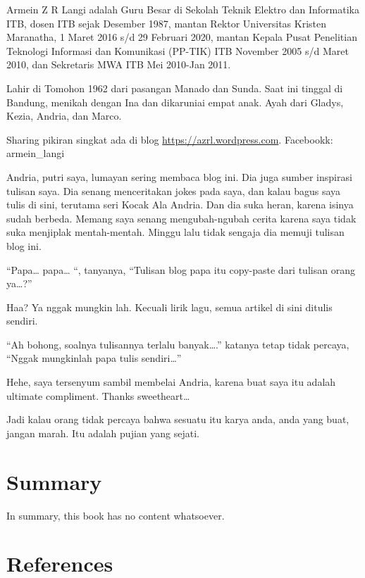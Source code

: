 \documentclass[
  letterpaper,
  DIV=11,
  numbers=noendperiod]{scrreprt}
\begin{document}
Armein Z R Langi adalah Guru Besar di Sekolah Teknik Elektro dan
Informatika ITB, dosen ITB sejak Desember 1987, mantan Rektor
Universitas Kristen Maranatha, 1 Maret 2016 s/d 29 Februari 2020, mantan
Kepala Pusat Penelitian Teknologi Informasi dan Komunikasi (PP-TIK) ITB
November 2005 s/d Maret 2010, dan Sekretaris MWA ITB Mei 2010-Jan 2011.

Lahir di Tomohon 1962 dari pasangan Manado dan Sunda. Saat ini tinggal
di Bandung, menikah dengan Ina dan dikaruniai empat anak. Ayah dari
Gladys, Kezia, Andria, dan Marco.

Sharing pikiran singkat ada di blog \url{https://azrl.wordpress.com}.
Facebookk: armein\_langi

Andria, putri saya, lumayan sering membaca blog ini. Dia juga sumber
inspirasi tulisan saya. Dia senang menceritakan jokes pada saya, dan
kalau bagus saya tulis di sini, terutama seri Kocak Ala Andria. Dan dia
suka heran, karena isinya sudah berbeda. Memang saya senang
mengubah-ngubah cerita karena saya tidak suka menjiplak mentah-mentah.
Minggu lalu tidak sengaja dia memuji tulisan blog ini.

``Papa\ldots{} papa\ldots{} ``, tanyanya, ``Tulisan blog papa itu
copy-paste dari tulisan orang ya\ldots?''

Haa? Ya nggak mungkin lah. Kecuali lirik lagu, semua artikel di sini
ditulis sendiri.

``Ah bohong, soalnya tulisannya terlalu banyak\ldots.'' katanya tetap
tidak percaya, ``Nggak mungkinlah papa tulis sendiri\ldots{}''

Hehe, saya tersenyum sambil membelai Andria, karena buat saya itu adalah
ultimate compliment. Thanks sweetheart\ldots{}

Jadi kalau orang tidak percaya bahwa sesuatu itu karya anda, anda yang
buat, jangan marah. Itu adalah pujian yang sejati.


\chapter{Summary}\label{summary}

In summary, this book has no content whatsoever.


\chapter*{References}\label{references}


\label{refs}
\end{document}
